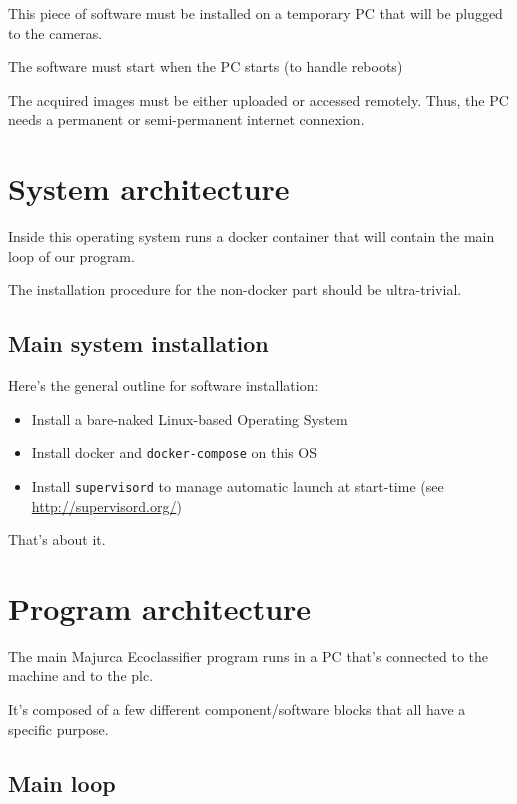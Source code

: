 This piece of software must be installed on a temporary PC that will be plugged to the cameras.

The software must start when the PC starts (to handle reboots)

The acquired images must be either uploaded or accessed remotely. Thus, the PC needs a permanent or semi-permanent internet connexion.

\section{System architecture}

Inside this operating system runs a \gls{docker} container that will contain the main loop of our program.

The installation procedure for the non-docker part should be ultra-trivial.

\subsection{Main system installation}

Here's the general outline for software installation:

\begin{itemize}
    \item Install a bare-naked Linux-based Operating System
    \item Install \gls{docker} and \texttt{docker-compose} on this OS
    \item Install \texttt{supervisord} to manage automatic launch at start-time (see \url{http://supervisord.org/})
\end{itemize}

That's about it.


\section{Program architecture}

The main Majurca Ecoclassifier program runs in a PC that's connected to the machine and to the \gls{plc}.


It's composed of a few different component/software blocks that all have a specific purpose.

\subsection{Main loop}

